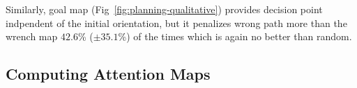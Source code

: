 Similarly, goal map (Fig~\ref{fig:planning-qualitative}) provides decision point indpendent of the initial orientation, but it penalizes wrong path more than the wrench map $42.6$\% ($\pm 35.1$\%) of the times which is again no better than random.
% 



\subsection{Computing Attention Maps}
